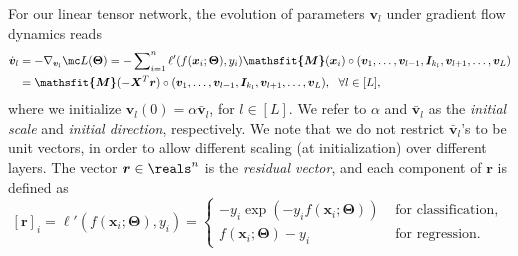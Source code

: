 \documentclass{article} %
\def\vr{{\bm{r}}}
\def\vv{{\bm{v}}}
\def\vx{{\bm{x}}}
\def\mI{{\bm{I}}}
\def\mX{{\bm{X}}}
\newcommand{\tens}[1]{\bm{\mathsfit{#1}}}
\def\tM{{\tens{M}}}
\newcommand{\bTheta}{\bm{\Theta}}
\begin{document}
For our linear tensor network, the evolution of parameters $\vv_l$ under gradient flow dynamics reads
\begin{align*}
    \dot \vv_l 
    &= -\nabla_{\vv_l} \mc L(\bTheta) 
    = -\sum\nolimits_{i=1}^n \ell'(f(\vx_i;\bTheta),y_i) \tM(\vx_i) \circ (\vv_1, \dots, \vv_{l-1}, \mI_{k_l}, \vv_{l+1}, \dots, \vv_L)\\
    &= \tM(-\mX^T \vr) \circ (\vv_1, \dots, \vv_{l-1}, \mI_{k_l}, \vv_{l+1}, \dots, \vv_L),~~\forall l \in [L],
\end{align*}
where we initialize $\vv_l(0) = \alpha \bar \vv_l$, for $l \in [L]$. We refer to $\alpha$ and $\bar \vv_l$ as the \emph{initial scale} and \emph{initial direction}, respectively. We note that we do not restrict $\bar \vv_l$'s to be unit vectors, in order to allow different scaling (at initialization) over different layers. The vector $\vr \in \reals^{n}$ is the \emph{residual vector}, and each component of $\vr$ is defined as
\begin{equation}
\label{eq:residual-vec}
    [\vr]_i = \ell'(f(\vx_i;\bTheta),y_i) =
    \begin{cases}
    -y_i \exp(-y_i f(\vx_i;\bTheta)) & \text{ for classification, }\\
    f(\vx_i;\bTheta) - y_i & \text{ for regression. }
    \end{cases}
\end{equation}
\end{document}
